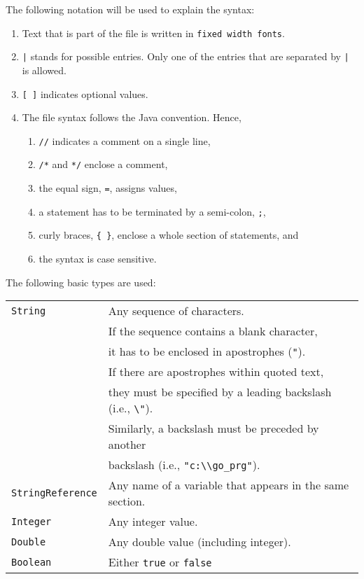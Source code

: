 The following notation will be used to explain the syntax:
\begin{enumerate}
\item Text that is part of the file is written in \verb$fixed width fonts$.
\item \verb$|$ stands for possible entries. Only one of the entries that are separated by \verb$|$ is allowed.
\item \verb$[ ]$ indicates optional values.
\item The file syntax follows the Java convention. Hence,
\begin{enumerate}
\item \verb$//$ indicates a comment on a single line,
\item \verb$/*$ and \verb$*/$ enclose a comment,
\item the equal sign, \verb$=$, assigns values,
\item a statement has to be terminated by a semi-colon, \verb$;$,
\item curly braces, \verb${ }$, enclose a whole section of statements, and
\item the syntax is case sensitive.
\end{enumerate}
\end{enumerate}

\noindent The following basic types are used:\\[5mm]
\begin{tabular}{|l|l|} \hline
\verb$String$ & Any sequence of characters.\\ &
  If the sequence contains a blank character,\\ &
 it has to be enclosed in apostrophes (\verb$"$). \\
  &  If there are apostrophes within quoted text,\\ &
  they must be specified by a leading backslash (i.e., \verb$\"$). \\ &
 Similarly, a backslash must be preceded by another \\ &
 backslash (i.e., \verb$"c:\\go_prg"$).
\\ \hline
\verb$StringReference$  &  Any name of a variable that appears in the same section. \\ \hline
\verb$Integer$  &  Any integer value. \\ \hline
\verb$Double$  &  Any double value (including integer). \\ \hline
\verb$Boolean$  &  Either \verb$true$ or \verb$false$ \\ \hline
\end{tabular}
~\\


